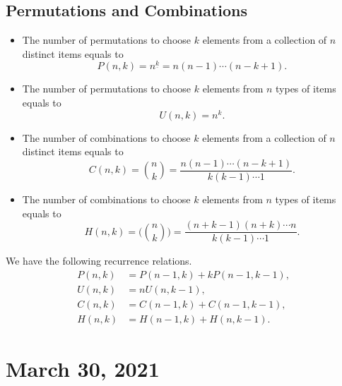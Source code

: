 \documentclass[11pt]{article}
\begin{document}
\subsection{Permutations and Combinations}
\begin{itemize}
  \item The number of permutations to choose $k$ elements from a collection of $n$ distinct items equals to
  \begin{equation*}
    P(n, k) = n^{\underline{k}} = n(n-1) \cdots (n-k+1).
  \end{equation*}
  \item The number of permutations to choose $k$ elements from $n$ types of items equals to
  \begin{equation*}
    U(n, k) = n^k.
  \end{equation*}
  \item The number of combinations to choose $k$ elements from a collection of $n$ distinct items equals to
  \begin{equation*}
    C(n, k) = \binom{n}{k} = \frac{n(n-1) \cdots (n-k+1)}{k(k-1) \cdots 1}.
  \end{equation*}
  \item The number of combinations to choose $k$ elements from $n$ types of items equals to
  \begin{equation*}
    H(n, k) = \biggl(\!\!\binom{n}{k}\!\!\biggr) = \frac{(n+k-1)(n+k) \cdots n}{k(k-1) \cdots 1}.
  \end{equation*}
\end{itemize}

We have the following recurrence relations.
\begin{align*}
  P(n, k) &= P(n-1, k) + kP(n-1, k-1), \\
  U(n, k) &= nU(n, k-1), \\
  C(n, k) &= C(n-1, k) + C(n-1, k-1), \\
  H(n, k) &= H(n-1, k) + H(n, k-1).
\end{align*}

\section{March 30, 2021}
\end{document}
